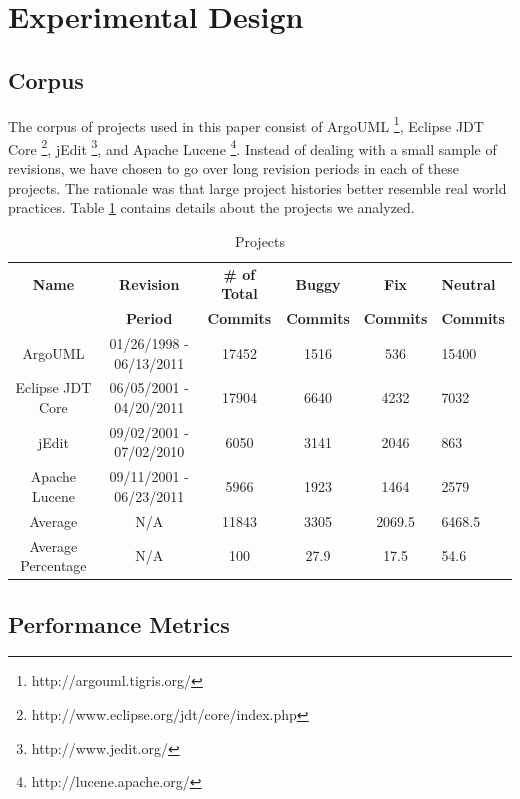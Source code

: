 \documentclass[10pt, conference, letterpaper, compsocconf]{IEEEtran}
\providecommand{\tabularnewline}{\\}
\begin{document}
\section{Experimental Design}
\subsection{Corpus}
\label{Corpus}
The corpus of projects used in this paper
consist of ArgoUML%
\footnote{http://argouml.tigris.org/%
}, Eclipse JDT Core%
\footnote{http://www.eclipse.org/jdt/core/index.php%
}, jEdit%
\footnote{http://www.jedit.org/%
}, and Apache Lucene%
\footnote{http://lucene.apache.org/%
}. Instead of dealing with a small sample of revisions, we have chosen
to go over long revision periods in each of these projects. The rationale
was that large project histories better resemble real world practices.
Table \ref{tab:projects} contains details about the projects we analyzed.


\begin{table}
\caption{Projects}

\begin{center}
\label{tab:projects}
\setlength{\extrarowheight}{2pt}

\begin{tabular}{cccccp{2.3cm}}
\hline 
\textbf{Name}  & \textbf{Revision}  & \textbf{\# of Total}& \textbf{Buggy}& \textbf{Fix}& \textbf{Neutral}\tabularnewline
& \textbf{Period}  &\textbf{Commits} & \textbf{Commits}&\textbf{Commits}&\textbf{Commits}\tabularnewline

\hline 
ArgoUML  & 01/26/1998 - 06/13/2011  & 17452 & 1516 & 536& 15400\tabularnewline
\hline 
Eclipse JDT Core  & 06/05/2001 - 04/20/2011  & 17904 & 6640 & 4232& 7032\tabularnewline
\hline 
jEdit  & 09/02/2001 - 07/02/2010  & 6050& 3141& 2046& 863\tabularnewline
\hline 
Apache Lucene  & 09/11/2001 - 06/23/2011  & 5966& 1923& 1464& 2579\tabularnewline
\hline
Average &N/A&11843&3305&2069.5&6468.5\tabularnewline
\hline
Average Percentage& N/A&100 &27.9&17.5&54.6\tabularnewline
\hline
\end{tabular}
\end{center}


\end{table}

\subsection{Performance Metrics}
\label{section:PerformanceMetrics}
\end{document}
